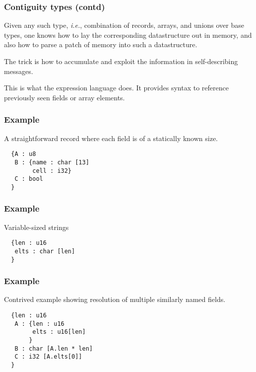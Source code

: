 \documentclass{beamer}
\newcommand{\ie}{\textit{i.e.}}
\begin{document}
\begin{frame}\frametitle{Contiguity types (contd)}

Given any such type, \ie, combination of records, arrays, and unions
over base types, one knows how to lay the corresponding datastructure
out in memory, and also how to parse a patch of memory into such a
datastructure.

\vspace*{5mm}

The trick is how to accumulate and exploit the information in self-describing messages.

\vspace*{5mm}

This is what the expression language does. It provides syntax to
reference previously seen fields or array elements.

\vspace*{5mm}

\end{frame}


\begin{frame}[fragile]\frametitle{Example}

A straightforward record where each field is of a statically known size.

\begin{verbatim}
  {A : u8
   B : {name : char [13]
        cell : i32}
   C : bool
  }
\end{verbatim}
\end{frame}

\begin{frame}[fragile]\frametitle{Example}

Variable-sized strings

\begin{verbatim}
  {len : u16
   elts : char [len]
  }
\end{verbatim}
\end{frame}


\begin{frame}[fragile]\frametitle{Example}

Contrived example showing resolution of multiple similarly named fields.

\begin{verbatim}
  {len : u16
   A : {len : u16
        elts : u16[len]
       }
   B : char [A.len * len]
   C : i32 [A.elts[0]]
  }
\end{verbatim}

\end{frame}
\end{document}
